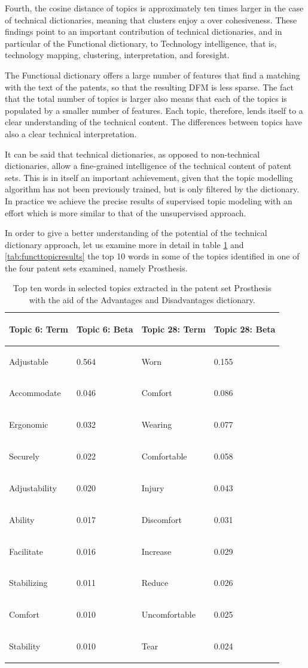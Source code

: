 \documentclass[]{book}
\theoremstyle{definition}
\theoremstyle{definition}
\theoremstyle{definition}
\theoremstyle{remark}
\begin{document}
Fourth, the cosine distance of topics is approximately ten times larger
in the case of technical dictionaries, meaning that clusters enjoy a
over cohesiveness. These findings point to an important contribution of
technical dictionaries, and in particular of the Functional dictionary,
to Technology intelligence, that is, technology mapping, clustering,
interpretation, and foresight.

The Functional dictionary offers a large number of features that find a
matching with the text of the patents, so that the resulting DFM is less
sparse. The fact that the total number of topics is larger also means
that each of the topics is populated by a smaller number of features.
Each topic, therefore, lends itself to a clear understanding of the
technical content. The differences between topics have also a clear
technical interpretation.

It can be said that technical dictionaries, as opposed to non-technical
dictionaries, allow a fine-grained intelligence of the technical content
of patent sets. This is in itself an important achievement, given that
the topic modelling algorithm has not been previously trained, but is
only filtered by the dictionary. In practice we achieve the precise
results of supervised topic modeling with an effort which is more
similar to that of the unsupervised approach.

In order to give a better understanding of the potential of the
technical dictionary approach, let us examine more in detail in table
\ref{tab:advtopicresults} and \ref{tab:functtopicresults} the top 10
words in some of the topics identified in one of the four patent sets
examined, namely Prosthesis.

\begin{table}

\caption{\label{tab:advtopicresults}Top ten words in selected topics extracted in the patent set Prosthesis with the aid of the Advantages and Disadvantages dictionary.}
\centering
\begin{tabular}[t]{>{\em\raggedright\arraybackslash}p{10em}l>{\em\raggedright\arraybackslash}p{10em}l}
\toprule
Topic 6: Term & Topic 6: Beta & Topic 28: Term & Topic 28: Beta\\
\midrule
Adjustable & 0.564 & Worn & 0.155\\
Accommodate & 0.046 & Comfort & 0.086\\
Ergonomic & 0.032 & Wearing & 0.077\\
Securely & 0.022 & Comfortable & 0.058\\
Adjustability & 0.020 & Injury & 0.043\\
\addlinespace
Ability & 0.017 & Discomfort & 0.031\\
Facilitate & 0.016 & Increase & 0.029\\
Stabilizing & 0.011 & Reduce & 0.026\\
Comfort & 0.010 & Uncomfortable & 0.025\\
Stability & 0.010 & Tear & 0.024\\
\bottomrule
\end{tabular}
\end{table}
\end{document}
